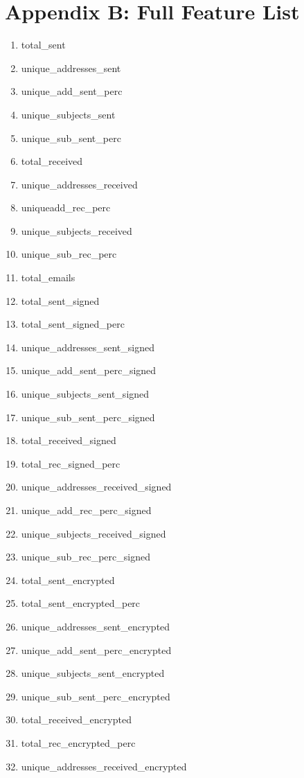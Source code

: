 \documentclass[12pt]{report}
\begin{document}
\chapter*{Appendix B: Full Feature List}
\begin{enumerate}
	\setlength\itemsep{-0.75em}
	\item total\_sent
	\item unique\_addresses\_sent
	\item unique\_add\_sent\_perc
	\item unique\_subjects\_sent
	\item unique\_sub\_sent\_perc
	\item total\_received
	\item unique\_addresses\_received
	\item uniqueadd\_rec\_perc
	\item unique\_subjects\_received
	\item unique\_sub\_rec\_perc
	\item total\_emails
	\item total\_sent\_signed
	\item total\_sent\_signed\_perc
	\item unique\_addresses\_sent\_signed
	\item unique\_add\_sent\_perc\_signed
	\item unique\_subjects\_sent\_signed
	\item unique\_sub\_sent\_perc\_signed
	\item total\_received\_signed
	\item total\_rec\_signed\_perc
	\item unique\_addresses\_received\_signed
	\item unique\_add\_rec\_perc\_signed
	\item unique\_subjects\_received\_signed
	\item unique\_sub\_rec\_perc\_signed
	\item total\_sent\_encrypted
	\item total\_sent\_encrypted\_perc
	\item unique\_addresses\_sent\_encrypted
	\item unique\_add\_sent\_perc\_encrypted
	\item unique\_subjects\_sent\_encrypted
	\item unique\_sub\_sent\_perc\_encrypted
	\item total\_received\_encrypted
	\item total\_rec\_encrypted\_perc
	\item unique\_addresses\_received\_encrypted

\end{enumerate}
\end{document}
